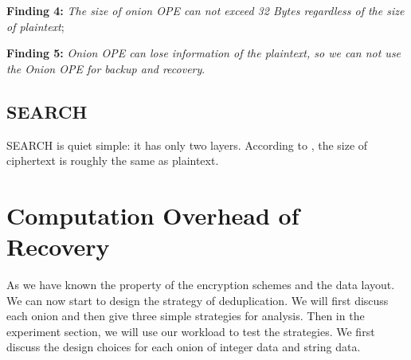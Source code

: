 

\textbf{Finding 4:} \textit{The size of onion OPE can not exceed 32 Bytes regardless of the size of plaintext};

\textbf{Finding 5:} \textit{Onion OPE can lose information of the plaintext, so we can not use the Onion OPE for backup and recovery}.

\subsection{SEARCH}
SEARCH is quiet simple: it has only two layers. According to \citep{song2000practical}, the size of ciphertext is roughly the same as plaintext.

\section{Computation Overhead of Recovery}
As we have known the property of the encryption schemes and the data layout. We can now start to design the strategy of deduplication. We will first discuss each onion and then give three simple strategies for analysis. Then in the experiment section, we will use our workload to test the strategies. We first discuss the design choices for each onion of integer data and string data. 


